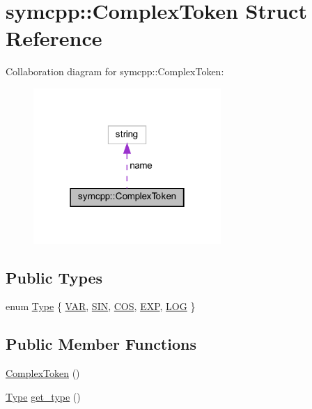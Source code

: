 \hypertarget{structsymcpp_1_1ComplexToken}{}\section{symcpp\+::Complex\+Token Struct Reference}
\label{structsymcpp_1_1ComplexToken}


Collaboration diagram for symcpp\+::Complex\+Token\+:
\nopagebreak
\begin{figure}[H]
\begin{center}
\leavevmode
\includegraphics[width=202pt]{structsymcpp_1_1ComplexToken__coll__graph}
\end{center}
\end{figure}
\subsection*{Public Types}
\begin{DoxyCompactItemize}
\item 
enum \mbox{\hyperlink{structsymcpp_1_1ComplexToken_a5d5ae44d6f5862b7e3a409156ac54ae3}{Type}} \{ \newline
\mbox{\hyperlink{structsymcpp_1_1ComplexToken_a5d5ae44d6f5862b7e3a409156ac54ae3abd5d4f26be00a727b2a32f52b9d3d475}{V\+AR}}, 
\mbox{\hyperlink{structsymcpp_1_1ComplexToken_a5d5ae44d6f5862b7e3a409156ac54ae3a9d5179f6cc5d8de195f45da25251e202}{S\+IN}}, 
\mbox{\hyperlink{structsymcpp_1_1ComplexToken_a5d5ae44d6f5862b7e3a409156ac54ae3a3247d8325a85d40c7d15ca05421b1c5e}{C\+OS}}, 
\mbox{\hyperlink{structsymcpp_1_1ComplexToken_a5d5ae44d6f5862b7e3a409156ac54ae3aa36465d09ca3bafd575190cd520a30d8}{E\+XP}}, 
\newline
\mbox{\hyperlink{structsymcpp_1_1ComplexToken_a5d5ae44d6f5862b7e3a409156ac54ae3a2f7e0212929c29739ab0e1966aa2990a}{L\+OG}}
 \}
\end{DoxyCompactItemize}
\subsection*{Public Member Functions}
\begin{DoxyCompactItemize}
\item 
\mbox{\hyperlink{structsymcpp_1_1ComplexToken_ab67322955478ca18076d0d0d9bc985bd}{Complex\+Token}} ()
\item 
\mbox{\hyperlink{structsymcpp_1_1ComplexToken_a5d5ae44d6f5862b7e3a409156ac54ae3}{Type}} \mbox{\hyperlink{structsymcpp_1_1ComplexToken_a86c40584c46720a630fa840b5d330f63}{get\+\_\+type}} ()
\end{DoxyCompactItemize}

